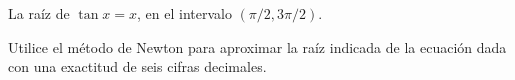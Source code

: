 \item La raíz de $\tan x = x$, en el intervalo $(\pi/2, 3\pi/2)$.
\par
Utilice el método de Newton para aproximar la raíz indicada de la ecuación dada con una exactitud de seis cifras decimales.
